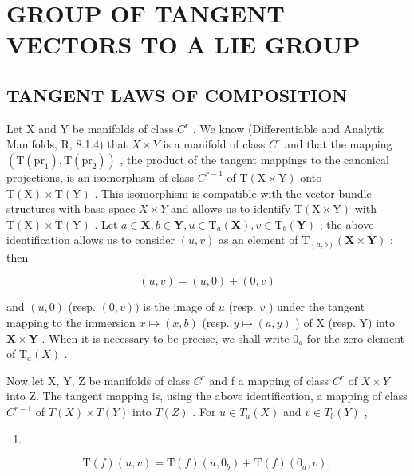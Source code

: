 \section{GROUP OF TANGENT VECTORS TO A LIE GROUP}

\subsection{TANGENT LAWS OF COMPOSITION}

Let X and Y be manifolds of class \(C^{r}\) . We know (Differentiable and Analytic Manifolds, R, 8.1.4) that \(X \times Y\) is a manifold of class \(C^{r}\) and that the mapping \((\mathrm{T}(\mathrm{pr}_{1}), \mathrm{T}(\mathrm{pr}_{2}))\) , the product of the tangent mappings to the canonical projections, is an isomorphism of class \(C^{r-1}\) of \(\mathrm{T}(\mathrm{X} \times \mathrm{Y})\) onto \(\mathrm{T}(\mathrm{X}) \times \mathrm{T}(\mathrm{Y})\) . This isomorphism is compatible with the vector bundle structures with base space \(X \times Y\) and allows us to identify \(\mathrm{T}(\mathrm{X} \times \mathrm{Y})\) with \(\mathrm{T}(\mathrm{X}) \times \mathrm{T}(\mathrm{Y})\) . Let \(a \in \mathbf{X}, b \in \mathbf{Y}, u \in \mathrm{T}_a(\mathbf{X}), v \in \mathrm{T}_b(\mathbf{Y})\) ; the above identification allows us to consider \((u, v)\) as an element of \(\mathrm{T}_{(a,b)}(\mathbf{X} \times \mathbf{Y})\) ; then

\[
(u, v) = (u, 0) + (0, v)
\]

and \((u,0)\) (resp. \((0,v))\) is the image of \(u\) (resp. \(v\) ) under the tangent mapping to the immersion \(x\mapsto (x,b)\) (resp. \(y\mapsto (a,y)\) ) of X (resp. Y) into \(\mathbf{X}\times \mathbf{Y}\) . When it is necessary to be precise, we shall write \(0_{a}\) for the zero element of \(\mathrm{T}_a(X)\) .

Now let X, Y, Z be manifolds of class \(C^{r}\) and f a mapping of class \(C^{r}\) of \(X \times Y\) into Z. The tangent mapping is, using the above identification, a mapping of class \(C^{r-1}\) of \(T(X) \times T(Y)\) into \(T(Z)\) . For \(u \in T_{a}(X)\) and \(v \in T_{b}(Y)\) ,

\begin{enumerate}
\def\labelenumi{(\arabic{enumi})}
\tightlist
\item
\end{enumerate}

\[
\mathrm{T} (f) (u, v) = \mathrm{T} (f) (u, 0 _ {b}) + \mathrm{T} (f) (0 _ {a}, v),
\]

